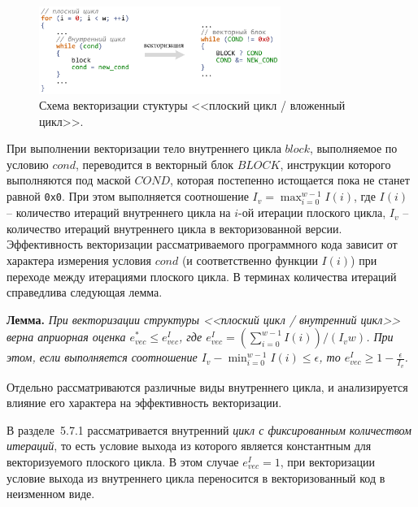 \documentclass[a4paper,14pt]{extarticle}                     %
\theoremstyle{plain}                                         %
\begin{document}
\begin{figure}[!ht]
\centering
\includegraphics[width=0.7\textwidth]{./fig/vec_flat_loop_nest.pdf}
\singlespacing
\caption{Схема векторизации стуктуры <<плоский цикл / вложенный цикл>>.}
\label{fig:vec_flat_loop_nest}
\end{figure}

При выполнении векторизации тело внутреннего цикла $block$, выполняемое по условию $cond$, переводится в векторный блок $BLOCK$, инструкции которого выполняются под маской $COND$, которая постепенно истощается пока не станет равной \texttt{0x0}.
При этом выполняется соотношение $I_v = \max_{i = 0}^{w - 1}{I(i)}$, где $I(i)$ -- количество итераций внутреннего цикла на $i$-ой итерации плоского цикла, $I_v$ -- количество итераций внутреннего цикла в векторизованной версии.
Эффективность векторизации рассматриваемого программного кода зависит от характера измерения условия $cond$ (и соответственно функции $I(i)$) при переходе между итерациями плоского цикла.
В терминах количества итераций справедлива следующая лемма.

\textbf{Лемма.} \textit{При векторизации структуры <<плоский цикл / внутренний цикл>> верна априорная оценка $e_{vec}^{*} \le e_{vec}^I$, где $e_{vec}^I = ( \sum_{i = 0}^{w - 1}{I(i)} ) / (I_v w)$.
При этом, если выполняется соотношение $I_v - \min_{i = 0}^{w - 1}{I(i)} \le \epsilon$, то $e_{vec}^I \ge 1 - \frac{\epsilon}{I_v}$.}

Отдельно рассматриваются различные виды внутреннего цикла, и анализируется влияние его характера на эффективность векторизации.

В разделе~5.7.1 рассматривается внутренний \textit{цикл с фиксированным количеством итераций}, то есть условие выхода из которого является константным для векторизуемого плоского цикла.
В этом случае $e_{vec}^I = 1$, при векторизации условие выхода из внутреннего цикла переносится в векторизованный код в неизменном виде.
\end{document}
